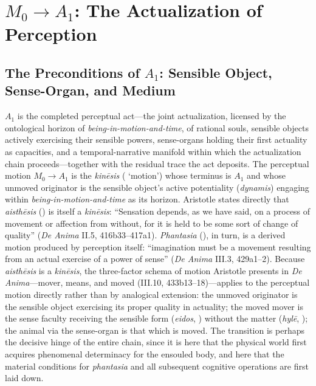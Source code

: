 \section{$M_0 \rightarrow A_1$: The Actualization of Perception}

\subsection{The Preconditions of $A_1$: Sensible Object, Sense-Organ, and Medium}

$A_1$ is the completed perceptual act---the joint actualization, licensed by the ontological horizon of \textit{being-in-motion-and-time}, of rational souls, sensible objects actively exercising their sensible powers, sense-organs holding their first actuality as capacities, and a temporal-narrative manifold within which the actualization chain proceeds---together with the residual trace the act deposits. The perceptual motion $M_0 \rightarrow A_1$ is the \textit{kinēsis} ( `motion') whose terminus is $A_1$ and whose unmoved originator is the sensible object's active potentiality (\textit{dynamis}) engaging within \textit{being-in-motion-and-time} as its horizon. Aristotle states directly that \textit{aisthēsis} () is itself a \textit{kinēsis}: ``Sensation depends, as we have said, on a process of movement or affection from without, for it is held to be some sort of change of quality'' (\textit{De Anima} II.5, 416b33--417a1). \textit{Phantasia} (), in turn, is a derived motion produced by perception itself: ``imagination must be a movement resulting from an actual exercise of a power of sense'' (\textit{De Anima} III.3, 429a1--2). Because \textit{aisthēsis} is a \textit{kinēsis}, the three-factor schema of motion Aristotle presents in \textit{De Anima}---mover, means, and moved (III.10, 433b13--18)---applies to the perceptual motion directly rather than by analogical extension: the unmoved originator is the sensible object exercising its proper quality in actuality; the moved mover is the sense faculty receiving the sensible form (\textit{eidos}, ) without the matter (\textit{hylē}, ); the animal via the sense-organ is that which is moved. The transition is perhaps the decisive hinge of the entire chain, since it is here that the physical world first acquires phenomenal determinacy for the ensouled body, and here that the material conditions for \textit{phantasia} and all subsequent cognitive operations are first laid down.

